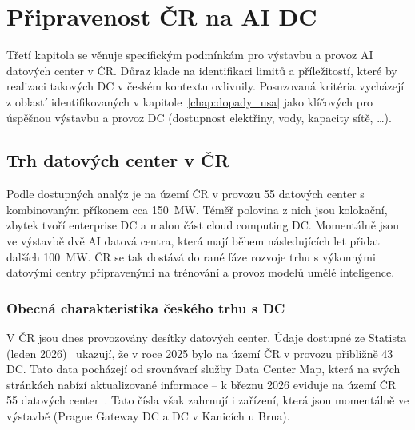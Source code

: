
\chapter{Připravenost ČR na AI DC}
\label{chap:cz}

Třetí kapitola se věnuje specifickým podmínkám pro výstavbu a provoz AI datových center v ČR. Důraz klade na identifikaci limitů a příležitostí, které by realizaci takových DC v českém kontextu ovlivnily. Posuzovaná kritéria vycházejí z oblastí identifikovaných v kapitole~\ref{chap:dopady_usa} jako klíčových pro úspěšnou výstavbu a provoz DC (dostupnost elektřiny, vody, kapacity sítě, \dots{}).

\section{Trh datových center v ČR}
\label{sec:cz_trh}


Podle dostupných analýz je na území ČR v provozu 55 datových center s kombinovaným příkonem cca 150~MW. Téměř polovina z nich jsou kolokační, zbytek tvoří enterprise DC a malou část cloud computing DC. Momentálně jsou ve výstavbě dvě AI datová centra, která mají během následujících let přidat dalších 100~MW. ČR se tak dostává do rané fáze rozvoje trhu s výkonnými datovými centry připravenými na trénování a provoz modelů umělé inteligence.

\subsection{Obecná charakteristika českého trhu s DC}
\label{subsec:cz_trh_prehled}

V ČR jsou dnes provozovány desítky datových center. Údaje dostupné ze Statista (leden 2026)~\cite{data_center_map_number_2025} ukazují, že v roce 2025 bylo na území ČR v provozu přibližně 43 DC. Tato data pocházejí od srovnávací služby Data Center Map, která na svých stránkách nabízí aktualizované informace -- k březnu 2026 eviduje na území ČR 55 datových center~\cite{data_center_map_czech_2026}. Tato čísla však zahrnují i zařízení, která jsou momentálně ve výstavbě (Prague Gateway DC a DC v Kanicích u Brna).

